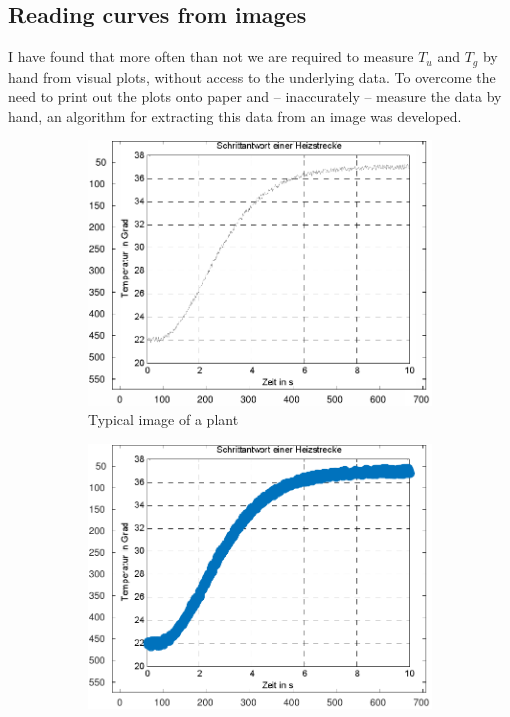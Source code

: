 \subsection{Reading curves from images}

I have found that more often than not we are required to measure $T_u$ and $T_g$
by  hand from visual plots, without access to the underlying data.  To  overcome
the need to  print  out  the plots onto paper and -- inaccurately -- measure the
data by hand, an algorithm for extracting this data from an image was developed.

\begin{figure}
    \centering
    \begin{subfigure}{.3\textwidth}
        \includegraphics[width=.95\linewidth]{images/plant}
        \caption{Typical image of a plant}
        \label{fig:image:plant}
    \end{subfigure}
    \begin{subfigure}{.3\textwidth}
        \includegraphics[width=.95\linewidth]{images/scatter_raw}

\end{subfigure}
\end{figure}
